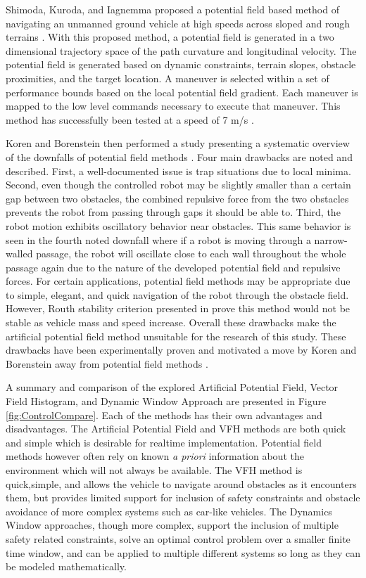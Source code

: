\documentclass[12pt,onecolumn]{report}
\begin{document}
Shimoda, Kuroda, and Iagnemma proposed a potential field based method of navigating an unmanned ground vehicle at high speeds across sloped and rough terrains \cite{Shimoda&Kuroda&Iagnemma2007}. With this proposed method, a potential field is generated in a two dimensional trajectory space of the path curvature and longitudinal velocity. The potential field is generated based on dynamic constraints, terrain slopes, obstacle proximities, and the target location. A maneuver is selected within a set of performance bounds based on the local potential field gradient. Each maneuver is mapped to the low level commands necessary to execute that maneuver. This method has successfully been tested at a speed of 7 m/s \cite{Shimoda&Kuroda&Iagnemma2007}.

Koren and Borenstein then performed a study presenting a systematic overview of the downfalls of potential field methods \cite{Koren&Borenstein1991}. Four main drawbacks are noted and described. First, a well-documented issue is trap situations due to local minima. Second, even though the controlled robot may be slightly smaller than a certain gap between two obstacles, the combined repulsive force from the two obstacles prevents the robot from passing through gaps it should be able to. Third, the robot motion exhibits oscillatory behavior near obstacles. This same behavior is seen in the fourth noted downfall where if a robot is moving through a narrow-walled passage, the robot will oscillate close to each wall throughout the whole passage again due to the nature of the developed potential field and repulsive forces. For certain applications, potential field methods may be appropriate due to simple, elegant, and quick navigation of the robot through the obstacle field. However, Routh stability criterion presented in \cite{Koren&Borenstein1991} prove this method would not be stable as vehicle mass and speed increase. Overall these drawbacks make the artificial potential field method unsuitable for the research of this study. These drawbacks have been experimentally proven and motivated a move by Koren and Borenstein away from potential field methods \cite{Koren&Borenstein1991}.

A summary and comparison of the explored Artificial Potential Field, Vector Field Histogram, and Dynamic Window Approach are presented in Figure \ref{fig:ControlCompare}. Each of the methods has their own advantages and disadvantages. The Artificial Potential Field and VFH methods are both quick and simple which is desirable for realtime implementation. Potential field methods however often rely on known \textit{a priori} information about the environment which will not always be available. The VFH method is quick,simple, and allows the vehicle to navigate around obstacles as it encounters them, but provides limited support for inclusion of safety constraints and obstacle avoidance of more complex systems such as car-like vehicles. The Dynamics Window approaches, though more complex, support the inclusion of multiple safety related constraints, solve an optimal control problem over a smaller finite time window, and can be applied to multiple different systems so long as they can be modeled mathematically. 
\end{document}
